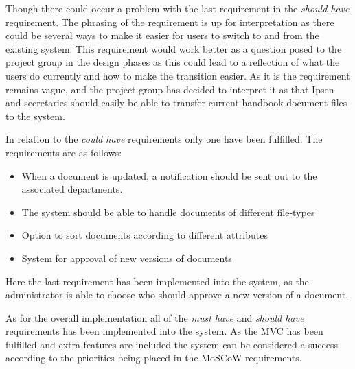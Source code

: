 Though there could occur a problem with the last requirement in the \textit{should have} requirement.
The phrasing of the requirement is up for interpretation as there could be several ways to make it easier for users to switch to and from the existing system.
This requirement would work better as a question posed to the project group in the design phases as this could lead to a reflection of what the users do currently and how to make the transition easier.
As it is the requirement remains vague, and the project group has decided to interpret it as that Ipsen and secretaries should easily be able to transfer current handbook document files to the system.

In relation to the \textit{could have} requirements only one have been fulfilled.
The requirements are as follows:

 \begin{itemize}
 	\item 
    When a document is updated, a notification should be sent out to the associated departments.
	\item 
    The system should be able to handle documents of different file-types
    \item 
    Option to sort documents according to different attributes
    \item 
    System for approval of new versions of documents
\end{itemize}

Here the last requirement has been implemented into the system, as the administrator is able to choose who should approve a new version of a document.

As for the overall implementation all of the \textit{must have} and \textit{should have} requirements has been implemented into the system.
As the MVC has been fulfilled and extra features are included the system can be considered a success according to the priorities being placed in the MoSCoW requirements.


